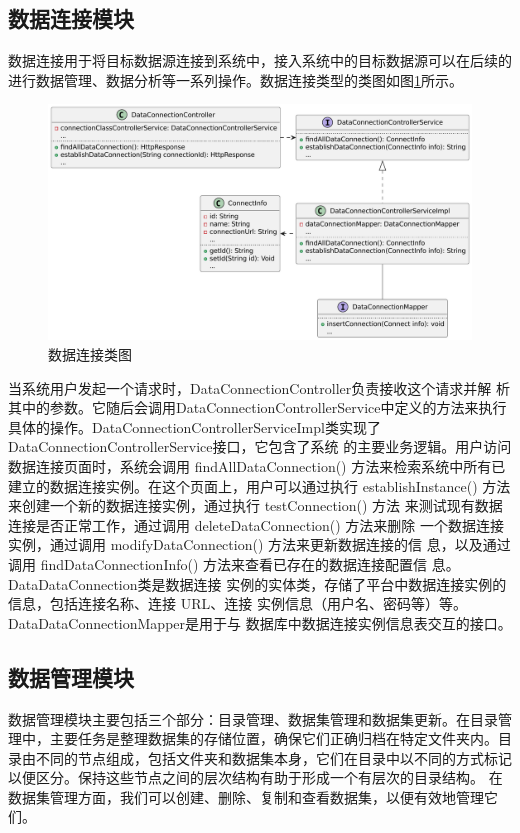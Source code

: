 \subsection{数据连接模块}
数据连接用于将目标数据源连接到系统中，接入系统中的目标数据源可以在后续的进行数据管理、数据分析等一系列操作。数据连接类型的类图如图\ref{fig:dataconneclass}所示。
\begin{figure}[H]
    \centering
    \includegraphics[width=.9\linewidth]{figure/数据连接类图.pdf}
    \caption{数据连接类图}
    \label{fig:dataconneclass}
\end{figure}
当系统用户发起一个请求时，DataConnectionController负责接收这个请求并解
析其中的参数。它随后会调用DataConnectionControllerService中定义的方法来执行具体的操作。DataConnectionControllerServiceImpl类实现了DataConnectionControllerService接口，它包含了系统
的主要业务逻辑。用户访问数据连接页面时，系统会调用 findAllDataConnection()
方法来检索系统中所有已建立的数据连接实例。在这个页面上，用户可以通过执行
establishInstance() 方法来创建一个新的数据连接实例，通过执行 testConnection() 方法
来测试现有数据连接是否正常工作，通过调用 deleteDataConnection() 方法来删除
一个数据连接实例，通过调用 modifyDataConnection() 方法来更新数据连接的信
息，以及通过调用 findDataConnectionInfo() 方法来查看已存在的数据连接配置信
息。DataDataConnection类是数据连接
实例的实体类，存储了平台中数据连接实例的信息，包括连接名称、连接 URL、连接
实例信息（用户名、密码等）等。DataDataConnectionMapper是用于与
数据库中数据连接实例信息表交互的接口。
\subsection{数据管理模块}
数据管理模块主要包括三个部分：目录管理、数据集管理和数据集更新。在目录管理中，主要任务是整理数据集的存储位置，确保它们正确归档在特定文件夹内。目录由不同的节点组成，包括文件夹和数据集本身，它们在目录中以不同的方式标记以便区分。保持这些节点之间的层次结构有助于形成一个有层次的目录结构。
在数据集管理方面，我们可以创建、删除、复制和查看数据集，以便有效地管理它们。

